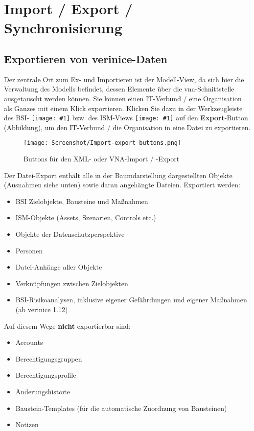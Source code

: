 \documentclass[a4paper,10pt]{book}
\newcommand{\icon}[1]{\texttt{[image: \#1]}}
\begin{document}
\chapter{Import / Export / Synchronisierung}

\section{Exportieren von verinice-Daten} \label{Exportieren von verinice-Daten}
Der zentrale Ort zum Ex- und Importieren ist der Modell-View, da sich hier die Verwaltung des Modells befindet, dessen Elemente über die vna-Schnittstelle ausgetauscht werden können.
Sie können einen IT-Verbund / eine Organisation als Ganzes mit einem Klick exportieren. Klicken Sie dazu in der Werkzeugleiste des BSI-
\icon{Icon/GS_Modell.png} bzw. des ISM-Views \icon{Icon/Informationssicherheitsmodell.png} auf den
\textbf{Export}-Button (Abbildung), um den IT-Verbund / die Organisation in eine Datei zu exportieren.
\newline
\begin{figure}[htb!]
  \centering
  \texttt{[image: Screenshot/Import-export\_buttons.png]}
  \caption{\label{Buttons fuer den XML- oder VNA-Import / -Export} Buttons für den XML- oder VNA-Import / -Export}
\end{figure}
\newline
Der Datei-Export enthält alle in der Baumdarstellung dargestellten Objekte (Ausnahmen siehe unten) sowie daran angehängte Dateien.
\newline
Exportiert werden:
\begin{itemize}
 \item BSI Zielobjekte, Bausteine und Maßnahmen
 \item ISM-Objekte (Assets, Szenarien, Controls etc.)
 \item Objekte der Datenschutzperspektive
 \item Personen
 \item Datei-Anhänge aller Objekte
 \item Verknüpfungen zwischen Zielobjekten
 \item BSI-Risikoanalysen, inklusive eigener Gefährdungen und eigener
   Maßnahmen (ab verinice 1.12)
\end{itemize}
Auf diesem Wege \textbf{nicht} exportierbar sind:
\begin{itemize}
 \item Accounts
 \item Berechtigungsgruppen
 \item Berechtigungsprofile
 \item Änderungshistorie
 \item Baustein-Templates (für die automatische Zuordnung von Bausteinen)
 \item Notizen
\end{itemize}
\end{document}
